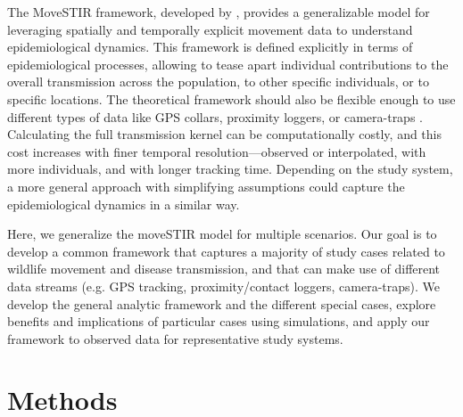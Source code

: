 \documentclass[letterpaper]{article}
\begin{document}
The MoveSTIR framework, developed by \citet{Wilber2022}, provides a generalizable model for leveraging spatially and temporally explicit movement data to understand epidemiological dynamics. This framework is defined explicitly in terms of epidemiological processes, allowing to tease apart individual contributions to the overall transmission across the population, to other specific individuals, or to specific locations. The theoretical framework should also be flexible enough to use different types of data like GPS collars, proximity loggers, or camera-traps \citep{Wilber2022}. 
Calculating the full transmission kernel can be computationally costly, and this cost increases with finer temporal resolution—observed or interpolated, with more individuals, and with longer tracking time. Depending on the study system, a more general approach with simplifying assumptions could capture the epidemiological dynamics in a similar way. 



Here, we generalize the moveSTIR model for multiple scenarios. Our goal is to develop a common framework that captures a majority of study cases related to wildlife movement and disease transmission, and that can make use of different data streams (e.g. GPS tracking, proximity/contact loggers, camera-traps). 
We develop the general analytic framework and the different special cases, explore benefits and implications of particular cases using simulations, and apply our framework to observed data for representative study systems.

\section*{Methods}
\end{document}
